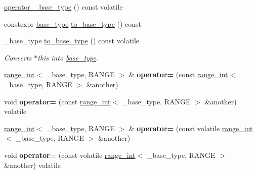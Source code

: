 \begin{DoxyCompactItemize}
\item 
\mbox{\hyperlink{classfsl_1_1lg_1_1range__int_a0ccee23a812d577e62cedf54d5633792}{operator \+\_\+base\+\_\+type}} () const volatile
\item 
constexpr \mbox{\hyperlink{classfsl_1_1lg_1_1range__int_a901feb77897b3353d554f06d4d6a8f4a}{base\+\_\+type}} \mbox{\hyperlink{classfsl_1_1lg_1_1range__int_ac34c6bfd6650ef7bce0f4f5be588d379}{to\+\_\+base\+\_\+type}} () const
\item 
\mbox{\label{classfsl_1_1lg_1_1range__int_a7c2df5c4c281ebf98452d2424bb06439}} 
\+\_\+base\+\_\+type \mbox{\hyperlink{classfsl_1_1lg_1_1range__int_a7c2df5c4c281ebf98452d2424bb06439}{to\+\_\+base\+\_\+type}} () const volatile
\begin{DoxyCompactList}\small\item\em Converts $\ast$this into \mbox{\hyperlink{classfsl_1_1lg_1_1range__int_a901feb77897b3353d554f06d4d6a8f4a}{base\+\_\+type}}. \end{DoxyCompactList}\item 
\mbox{\label{classfsl_1_1lg_1_1range__int_a1356dae4f80c8c2e3b0118320a1e9dcf}} 
\mbox{\hyperlink{classfsl_1_1lg_1_1range__int}{range\+\_\+int}}$<$ \+\_\+base\+\_\+type, R\+A\+N\+GE $>$ \& {\bfseries operator=} (const \mbox{\hyperlink{classfsl_1_1lg_1_1range__int}{range\+\_\+int}}$<$ \+\_\+base\+\_\+type, R\+A\+N\+GE $>$ \&another)
\item 
\mbox{\label{classfsl_1_1lg_1_1range__int_a12cbcfc3989c4a4211e5ee9e4f6dc057}} 
void {\bfseries operator=} (const \mbox{\hyperlink{classfsl_1_1lg_1_1range__int}{range\+\_\+int}}$<$ \+\_\+base\+\_\+type, R\+A\+N\+GE $>$ \&another) volatile
\item 
\mbox{\label{classfsl_1_1lg_1_1range__int_ad68b8d722621d6e1eb0f18e86abf67b4}} 
\mbox{\hyperlink{classfsl_1_1lg_1_1range__int}{range\+\_\+int}}$<$ \+\_\+base\+\_\+type, R\+A\+N\+GE $>$ \& {\bfseries operator=} (const volatile \mbox{\hyperlink{classfsl_1_1lg_1_1range__int}{range\+\_\+int}}$<$ \+\_\+base\+\_\+type, R\+A\+N\+GE $>$ \&another)
\item 
\mbox{\label{classfsl_1_1lg_1_1range__int_aae783349cffc3aaa08c0ce9cc38e60a4}} 
void {\bfseries operator=} (const volatile \mbox{\hyperlink{classfsl_1_1lg_1_1range__int}{range\+\_\+int}}$<$ \+\_\+base\+\_\+type, R\+A\+N\+GE $>$ \&another) volatile

\end{DoxyCompactItemize}
